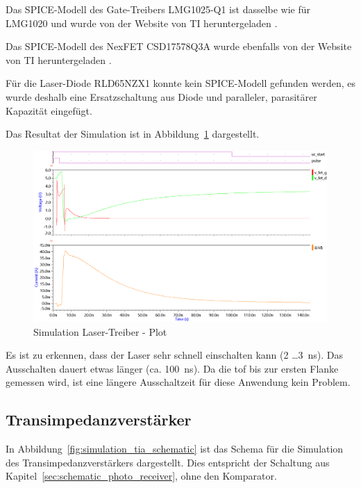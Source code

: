 Das SPICE-Modell des Gate-Treibers LMG1025-Q1 ist dasselbe wie für LMG1020 und wurde von der Website von TI
heruntergeladen \cite{ti2024lmg1025q1}.

Das SPICE-Modell des NexFET CSD17578Q3A wurde ebenfalls von der Website von TI heruntergeladen
\cite{ti2024csd17578q3a}.

Für die Laser-Diode RLD65NZX1 konnte kein SPICE-Modell gefunden werden, es wurde deshalb eine Ersatzschaltung aus Diode
und paralleler, parasitärer Kapazität eingefügt.

Das Resultat der Simulation ist in Abbildung~\ref{fig:simulation_laser_driver_plot} dargestellt.

\begin{figure}[H]
    \centering
    \includegraphics[width=\textwidth]{graphics/simulation_laser_driver_plot.png}
    \caption{Simulation Laser-Treiber - Plot}\label{fig:simulation_laser_driver_plot}
\end{figure}

Es ist zu erkennen, dass der Laser sehr schnell einschalten kann (2 \dots 3~ns). Das Ausschalten dauert etwas länger
(ca. 100~ns). Da die \acrshort{tof} bis zur ersten Flanke gemessen wird, ist eine längere Ausschaltzeit für diese
Anwendung kein Problem.

\subsection{Transimpedanzverstärker}

In Abbildung~\ref{fig:simulation_tia_schematic} ist das Schema für die Simulation des Transimpedanzverstärkers
dargestellt. Dies entspricht der Schaltung aus Kapitel~\ref{sec:schematic_photo_receiver}, ohne den Komparator.

